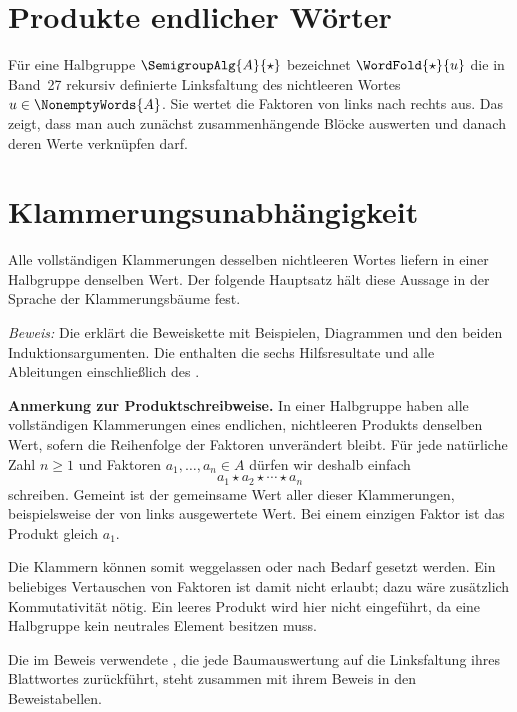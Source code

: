 \section{Produkte endlicher Wörter}

Für eine Halbgruppe \(\SemigroupAlg{A}{\star}\) bezeichnet
\(\WordFold{\star}{u}\) die in Band~27 rekursiv definierte Linksfaltung
des nichtleeren Wortes \(u\in\NonemptyWords{A}\). Sie wertet die Faktoren
von links nach rechts aus. Das
zeigt, dass man auch zunächst zusammenhängende Blöcke auswerten und danach
deren Werte verknüpfen darf.


\section{Klammerungsunabhängigkeit}

Alle vollständigen Klammerungen desselben nichtleeren Wortes liefern in
einer Halbgruppe denselben Wert. Der folgende Hauptsatz hält diese Aussage
in der Sprache der Klammerungsbäume fest.

\setcounter{formulaThm}{3}
\hypertarget{bracketing.main.independence}{}
\BracketingIndependence

\noindent\emph{Beweis:} Die \BracketingReadingLink{} erklärt die
Beweiskette mit Beispielen, Diagrammen und den beiden Induktionsargumenten.
Die \BracketingProofsLink{} enthalten die sechs Hilfsresultate und alle
Ableitungen einschließlich des \BracketingIndependenceProofLink{}.

\par\medskip
\hypertarget{bracketing.notation}{}

\noindent\textbf{Anmerkung zur Produktschreibweise.}
In einer Halbgruppe haben alle vollständigen Klammerungen eines endlichen,
nichtleeren Produkts denselben Wert, sofern die Reihenfolge der Faktoren
unverändert bleibt. Für jede natürliche Zahl \(n\geq 1\) und Faktoren
\(a_1,\ldots,a_n\in A\) dürfen wir deshalb einfach
\[
  a_1\star a_2\star\cdots\star a_n
\]
schreiben. Gemeint ist der gemeinsame Wert aller dieser Klammerungen,
beispielsweise der von links ausgewertete Wert. Bei einem einzigen Faktor
ist das Produkt gleich \(a_1\).

Die Klammern können somit weggelassen oder nach Bedarf gesetzt werden.
Ein beliebiges Vertauschen von Faktoren ist damit nicht erlaubt; dazu wäre zusätzlich
Kommutativität nötig. Ein leeres Produkt wird hier nicht eingeführt, da
eine Halbgruppe kein neutrales Element besitzen muss.

Die im Beweis verwendete
, die jede
Baumauswertung auf die Linksfaltung ihres Blattwortes zurückführt,
steht zusammen mit ihrem Beweis in den Beweistabellen.
